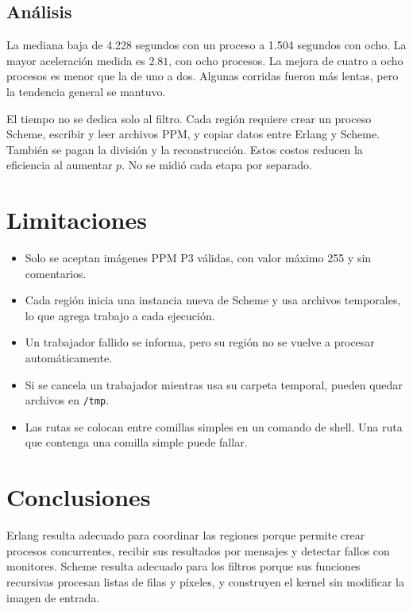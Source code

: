 \documentclass[11pt]{article}
\begin{document}
\subsection{Análisis}

La mediana baja de 4.228 segundos con un proceso a 1.504 segundos con ocho.
La mayor aceleración medida es $2.81$, con ocho procesos. La mejora de
cuatro a ocho procesos es menor que la de uno a dos. Algunas corridas
fueron más lentas, pero la tendencia general se mantuvo.

El tiempo no se dedica solo al filtro. Cada región requiere crear un proceso
Scheme, escribir y leer archivos PPM, y copiar datos entre Erlang y Scheme.
También se pagan la división y la reconstrucción. Estos costos reducen la
eficiencia al aumentar $p$. No se midió cada etapa por separado.

\section{Limitaciones}

\begin{itemize}
    \item Solo se aceptan imágenes PPM P3 válidas, con valor máximo 255 y sin
    comentarios.
    \item Cada región inicia una instancia nueva de Scheme y usa archivos
    temporales, lo que agrega trabajo a cada ejecución.
    \item Un trabajador fallido se informa, pero su región no se vuelve a
    procesar automáticamente.
    \item Si se cancela un trabajador mientras usa su carpeta temporal, pueden
    quedar archivos en \texttt{/tmp}.
    \item Las rutas se colocan entre comillas simples en un comando de shell.
    Una ruta que contenga una comilla simple puede fallar.
\end{itemize}

\section{Conclusiones}

Erlang resulta adecuado para coordinar las regiones porque permite crear
procesos concurrentes, recibir sus resultados por mensajes y detectar fallos
con monitores. Scheme resulta adecuado para los filtros porque sus funciones
recursivas procesan listas de filas y píxeles, y construyen el kernel sin
modificar la imagen de entrada.
\end{document}
